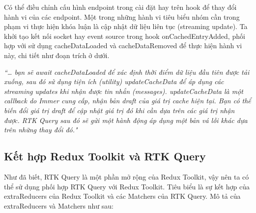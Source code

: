 Có thể điều chỉnh cấu hình endpoint trong cài đặt hay trên hook để thay đổi hành vi của các endpoint.
Một trong những hành vi tiêu biểu nhóm cần trong phạm vi thực hiện khóa luận là cập nhật dữ liệu liên tục (streaming update).
Ta khởi tạo kết nối socket hay event source trong hook onCachedEntryAdded, phối hợp với sử dụng cacheDataLoaded và cacheDataRemoved để thực hiện hành vi này, chi tiết như đoạn trích ở dưới.
\par

\textit{“… bạn sẽ await cacheDataLoaded để xác định thời điểm dữ liệu đầu tiên được tải xuống, sau đó sử dụng tiện ích (utility) updateCacheData để áp dụng các streaming updates khi nhận được tin nhắn (messages).
      updateCacheData là một callback do Immer cung cấp, nhận bản draft của giá trị cache hiện tại.
      Bạn có thể biến đổi giá trị draft để cập nhật giá trị đó khi cần dựa trên các giá trị nhận được.
      RTK Query sau đó sẽ gửi một hành động áp dụng một bản vá lỗi khác dựa trên những thay đổi đó."} \cite{chap4bib3}

\subsection{Kết hợp Redux Toolkit và RTK Query}

\tab Như đã biết, RTK Query là một phần mở rộng của Redux Toolkit, vậy nên ta có thể sử dụng phối hợp RTK Query với Redux Toolkit.
Tiêu biểu là sự kết hợp của extraReducers của Redux Toolkit và các Matchers của RTK Query.
Mô tả của extraReducers và Matchers như sau:

